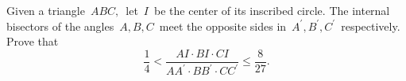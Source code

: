 Given a triangle $ \,ABC,\,$ let $ \,I\,$ be the center of its inscribed circle.
The internal bisectors of the angles $ \,A,B,C\,$ meet the opposite sides in $ \,A^{\prime },B^{\prime },C^{\prime }\,$ respectively.
Prove that
\[ \frac {1}{4} < \frac {AI\cdot BI\cdot CI}{AA^{\prime }\cdot BB^{\prime }\cdot CC^{\prime }} \leq \frac {8}{27}.\]
